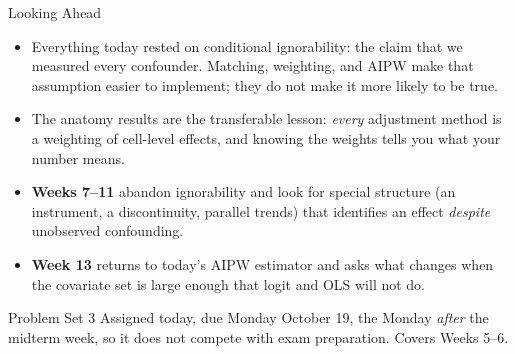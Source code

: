 \documentclass[aspectratio=169,11pt,xcolor=dvipsnames]{beamer}
\begin{document}
\begin{frame}[allowframebreaks,t]{Looking Ahead}
\begin{itemize}\itemsep4pt
  \item Everything today rested on \alert{conditional ignorability}: the claim
        that we measured every confounder. Matching, weighting, and AIPW make
        that assumption easier to implement; they do not make it more likely
        to be true.
  \item The anatomy results are the transferable lesson: \emph{every} adjustment
        method is a weighting of cell-level effects, and knowing the weights tells
        you what your number means.
  \item \textbf{Weeks 7--11} abandon ignorability and look for special structure
 (an instrument, a discontinuity, parallel trends) that identifies an
        effect \emph{despite} unobserved confounding.
  \item \textbf{Week 13} returns to today's AIPW estimator and asks what changes
        when the covariate set is large enough that logit and OLS will not do.
\end{itemize}
\vskip3pt
\begin{block}{Problem Set 3}
Assigned today, due Monday October 19, the Monday \emph{after} the midterm
week, so it does not compete with exam preparation. Covers Weeks 5--6.
\end{block}
\end{frame}
\end{document}
